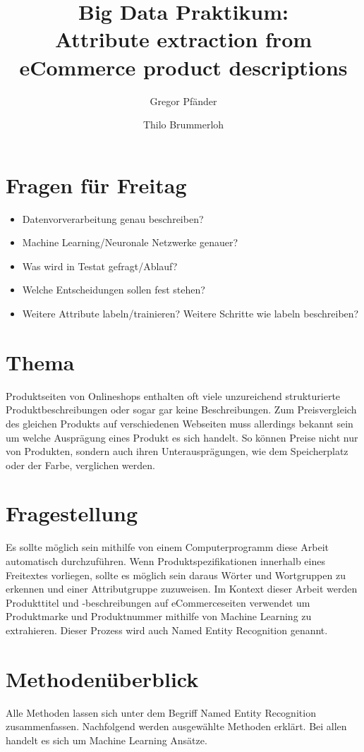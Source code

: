 \documentclass[paper=a4,12pt,listof=totoc]{scrartcl}%
\title{Big Data Praktikum: \\ Attribute extraction from eCommerce product descriptions}
\author{Gregor Pfänder 
\and Thilo Brummerloh}
\begin{document}
	\maketitle
	
	\section{Fragen für Freitag}
	\begin{itemize}
		\item Datenvorverarbeitung genau beschreiben?
		\item Machine Learning/Neuronale Netzwerke genauer?
		\item Was wird in Testat gefragt/Ablauf?
		\item Welche Entscheidungen sollen fest stehen?
		\item Weitere Attribute labeln/trainieren? Weitere Schritte wie labeln beschreiben?
	\end{itemize}
	
	\section{Thema}
	Produktseiten von Onlineshops enthalten oft viele unzureichend strukturierte Produktbeschreibungen oder sogar gar keine Beschreibungen. Zum Preisvergleich des gleichen Produkts auf verschiedenen Webseiten muss allerdings bekannt sein um welche Ausprägung eines Produkt es sich handelt. So können Preise nicht nur von Produkten, sondern auch ihren Unterausprägungen, wie dem Speicherplatz oder der Farbe, verglichen werden.
	
	\section{Fragestellung}
	Es sollte möglich sein mithilfe von einem Computerprogramm diese Arbeit automatisch durchzuführen. Wenn Produktspezifikationen innerhalb eines Freitextes vorliegen, sollte es möglich sein daraus Wörter und Wortgruppen zu erkennen und einer Attributgruppe zuzuweisen.
	Im Kontext dieser Arbeit werden Produkttitel und -beschreibungen auf eCommerceseiten verwendet um Produktmarke und Produktnummer mithilfe von Machine Learning zu extrahieren. Dieser Prozess wird auch Named Entity Recognition genannt.
	
	\section{Methodenüberblick}
	Alle Methoden lassen sich unter dem Begriff Named Entity Recognition zusammenfassen.	Nachfolgend werden ausgewählte Methoden erklärt. Bei allen handelt es sich um Machine Learning Ansätze. 
	
\end{document}
